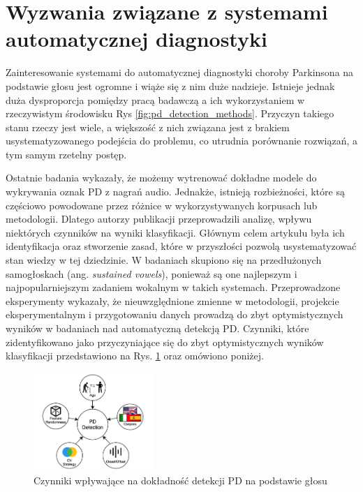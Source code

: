 \section{Wyzwania związane z systemami automatycznej diagnostyki}\label{sec:wyzwania}

Zainteresowanie systemami do automatycznej diagnostyki choroby Parkinsona na podstawie głosu jest ogromne i wiąże się z nim duże nadzieje.
Istnieje jednak duża dysproporcja pomiędzy pracą badawczą a ich wykorzystaniem w rzeczywistym środowisku Rys \ref{fig:pd_detection_methods}.
Przyczyn takiego stanu rzeczy jest wiele, a większość z nich związana jest z brakiem usystematyzowanego podejścia do problemu, co utrudnia porównanie
rozwiązań, a tym samym rzetelny postęp.

Ostatnie badania wykazały, że możemy wytrenować dokładne modele do wykrywania oznak PD z nagrań audio.
Jednakże, istnieją rozbieżności, które są częściowo powodowane przez różnice w
wykorzystywanych korpusach lub metodologii.
Dlatego autorzy publikacji \cite{SustainedVowelsProblems} przeprowadzili analizę, wpływu niektórych czynników na wyniki klasyfikacji.
Głównym celem artykułu była ich identyfikacja oraz stworzenie zasad, które w przyszłości pozwolą usystematyzować
stan wiedzy w tej dziedzinie.
W badaniach skupiono się na przedłużonych samogłoskach (ang. \emph{sustained vowels}), ponieważ są one najlepszym i najpopularniejszym zadaniem
wokalnym w takich systemach.
Przeprowadzone eksperymenty wykazały, że nieuwzględnione zmienne w metodologii, projekcie eksperymentalnym i
przygotowaniu danych prowadzą do zbyt optymistycznych wyników w badaniach nad automatyczną detekcją PD.
Czynniki, które zidentyfikowano jako przyczyniające się do zbyt optymistycznych wyników klasyfikacji
przedstawiono na Rys. \ref{fig:factors_PD_detection} oraz omówiono poniżej.


\begin{figure}[htbp]
	\centering
	\includegraphics[width=0.4\textwidth]{./img/influence_of_factors_on_PD_detection}
	\caption{Czynniki wpływające na dokładność detekcji PD na podstawie głosu \cite{SustainedVowelsProblems}}
    \label{fig:factors_PD_detection}
\end{figure}


